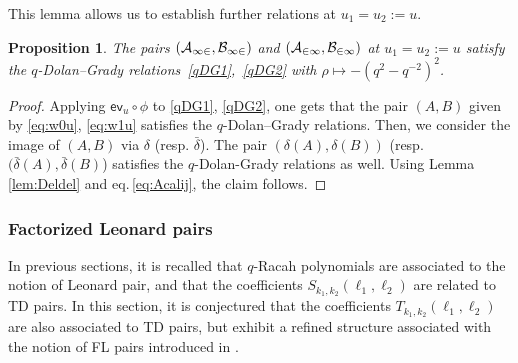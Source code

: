 \documentclass[11pt]{amsart}
\numberwithin{equation}{section}
\newtheorem{prop}[thm]{Proposition}
\numberwithin{equation}{section}
\begin{document}
This lemma allows us to establish further relations at $u_1=u_2:=u$.
\begin{prop}\label{prop:A12B12bis} The pairs $(\cal A_{12},\cal B_{12})$ and $(\cal A_{21},\cal B_{21})$ at $u_1=u_2:=u$ satisfy the $q$-Dolan--Grady relations~\eqref{qDG1},~\eqref{qDG2} with $\rho \mapsto -(q^2-q^{-2})^2$.
\end{prop}
\begin{proof} Applying $\textsf{ev}_u \circ \phi$ to \eqref{qDG1}, \eqref{qDG2}, one gets that the pair $(A,B)$ given by \eqref{eq:w0u}, \eqref{eq:w1u} satisfies the $q$-Dolan--Grady relations. Then, we consider the image of $(A,B)$ via $\delta$ (resp. $\bar\delta$). The pair $(\delta(A),\delta(B))$ (resp. $(\bar\delta(A),\bar\delta(B)$) satisfies the $q$-Dolan-Grady relations as well. Using Lemma \ref{lem:Deldel} and eq.\,\eqref{eq:Acalij}, the claim follows.
\end{proof}

\subsubsection{Factorized Leonard pairs} \label{sec:FLP}
In previous sections, 
it is  recalled that $q$-Racah polynomials are associated to the notion of Leonard pair, and that the coefficients $S_{k_1,k_2}(\ell_1,\ell_2)$ are related to TD pairs. In this section, it is conjectured that the coefficients $T_{k_1,k_2}(\ell_1,\ell_2)$ are also associated to TD pairs, but exhibit a refined structure associated with the notion of FL pairs introduced in \cite{CZ23}.
\end{document}
